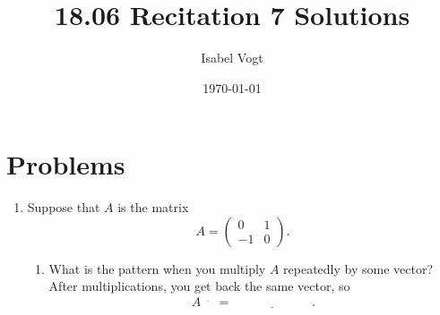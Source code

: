 \documentclass[11pt]{article}
\title{18.06 Recitation 7 Solutions}
\author{Isabel Vogt}
\date{\today}                                           %
\begin{document}
\maketitle

\section{Problems}

\begin{enumerate}



%
%
%
%
%



\item Suppose that $A$ is the matrix
\[A = \begin{pmatrix} 0 & 1 \\ -1 & 0 \end{pmatrix}.\]


\begin{enumerate}

\item What is the pattern when you multiply $A$ repeatedly by some vector?  After \underline{\phantom{aaaaaaa}} multiplications, you get back the same vector, so 
\[A^{\underline{\phantom{aaa}}} = \underline{\phantom{aaaaaaaaaaaa}}.\]


\end{enumerate}
\end{enumerate}
\end{document}
